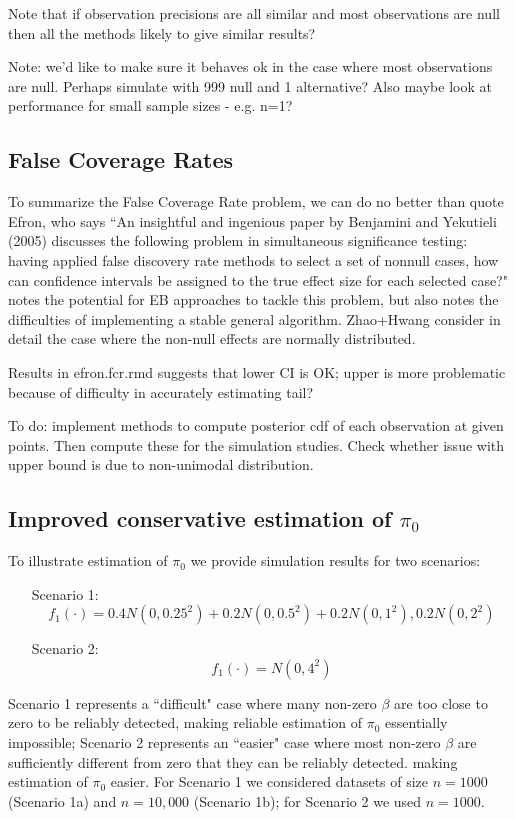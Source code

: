 \documentclass[11pt]{article}
\begin{document}
Note that if observation precisions are all similar and most observations are null then all the methods likely to give similar results?



Note: we'd like to make sure it behaves ok in the case where most observations are null.
Perhaps simulate with 999 null and 1 alternative?
Also maybe look at performance for small sample sizes - e.g. n=1?


\subsection*{False Coverage Rates}

To summarize the False Coverage Rate problem, we can do no better than quote Efron, who says
``An insightful and ingenious paper by Benjamini and
Yekutieli (2005) discusses the following problem in simultaneous
significance testing: having applied false
discovery rate methods to select a set of nonnull cases,
how can confidence intervals be assigned to the true
effect size for each selected case?" \cite{efron2008} notes the potential for EB approaches to tackle this problem,
but also notes the difficulties of implementing a stable general algorithm.
Zhao+Hwang consider in detail the case where the non-null effects are normally distributed.

Results in efron.fcr.rmd suggests that lower CI is OK; upper is more problematic because of difficulty in accurately estimating tail?

To do: implement methods to compute posterior cdf of each observation at given points. 
Then compute these for the simulation studies. Check whether issue with upper bound is due to non-unimodal distribution.


\subsection*{Improved conservative estimation of $\pi_0$}

To illustrate estimation of $\pi_0$ we provide simulation results for two scenarios:
\begin{enumerate}
\item[Scenario 1:]
\begin{equation}
f_1(\cdot) =  0.4 N(0,0.25^2) + 0.2 N(0,0.5^2) + 0.2 N(0,1^2), 0.2 N(0,2^2)
\end{equation}
\item[Scenario 2:]
\begin{equation}
f_1(\cdot) = N(0,4^2)
\end{equation}
\end{enumerate}
Scenario 1 represents a ``difficult" case where many non-zero $\beta$ are
too close to  zero to be reliably detected, making reliable estimation of $\pi_0$ essentially impossible; 
Scenario 2 represents an ``easier" case where most non-zero $\beta$ are
sufficiently different from zero that they can be reliably detected. making estimation of $\pi_0$ easier.
For Scenario 1 we considered datasets of size $n=1000$ (Scenario 1a) and $n=10,000$ (Scenario 1b);
for Scenario 2 we used $n=1000$.
\end{document}
